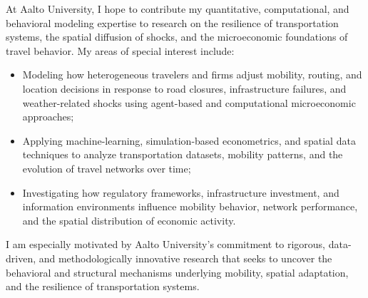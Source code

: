 \documentclass{nfr}
\begin{document}
At Aalto University, I hope to contribute my quantitative, computational, and behavioral modeling expertise to research on the resilience of transportation systems, the spatial diffusion of shocks, and the microeconomic foundations of travel behavior. 
My areas of special interest include:
\begin{itemize}
    \item Modeling how heterogeneous travelers and firms adjust mobility, routing, and location decisions in response to road closures, infrastructure failures, and weather-related shocks using agent-based and computational microeconomic approaches;
    \item Applying machine-learning, simulation-based econometrics, and spatial data techniques to analyze transportation datasets, mobility patterns, and the evolution of travel networks over time;
    \item Investigating how regulatory frameworks, infrastructure investment, and information environments influence mobility behavior, network performance, and the spatial distribution of economic activity.
\end{itemize}


I am especially motivated by Aalto University’s commitment to rigorous, data-driven, and methodologically innovative research that seeks to uncover the behavioral and structural mechanisms underlying mobility, spatial adaptation, and the resilience of transportation systems.
\\
\end{document}
